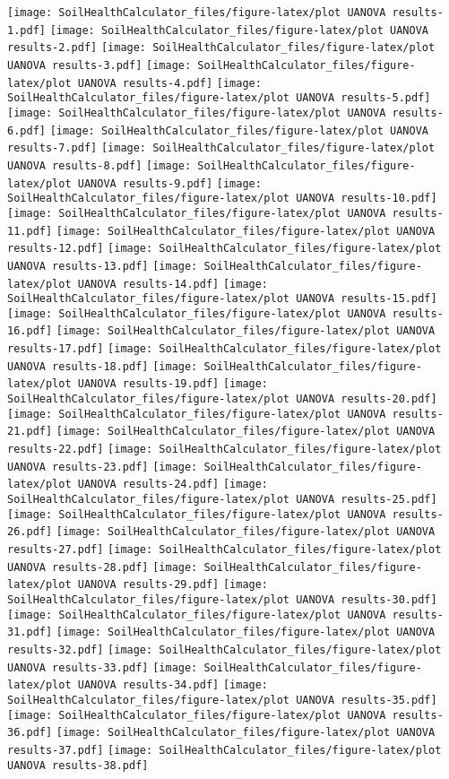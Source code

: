 \documentclass[]{article}
\begin{document}
\texttt{[image: SoilHealthCalculator\_files/figure-latex/plot UANOVA results-1.pdf]}
\texttt{[image: SoilHealthCalculator\_files/figure-latex/plot UANOVA results-2.pdf]}
\texttt{[image: SoilHealthCalculator\_files/figure-latex/plot UANOVA results-3.pdf]}
\texttt{[image: SoilHealthCalculator\_files/figure-latex/plot UANOVA results-4.pdf]}
\texttt{[image: SoilHealthCalculator\_files/figure-latex/plot UANOVA results-5.pdf]}
\texttt{[image: SoilHealthCalculator\_files/figure-latex/plot UANOVA results-6.pdf]}
\texttt{[image: SoilHealthCalculator\_files/figure-latex/plot UANOVA results-7.pdf]}
\texttt{[image: SoilHealthCalculator\_files/figure-latex/plot UANOVA results-8.pdf]}
\texttt{[image: SoilHealthCalculator\_files/figure-latex/plot UANOVA results-9.pdf]}
\texttt{[image: SoilHealthCalculator\_files/figure-latex/plot UANOVA results-10.pdf]}
\texttt{[image: SoilHealthCalculator\_files/figure-latex/plot UANOVA results-11.pdf]}
\texttt{[image: SoilHealthCalculator\_files/figure-latex/plot UANOVA results-12.pdf]}
\texttt{[image: SoilHealthCalculator\_files/figure-latex/plot UANOVA results-13.pdf]}
\texttt{[image: SoilHealthCalculator\_files/figure-latex/plot UANOVA results-14.pdf]}
\texttt{[image: SoilHealthCalculator\_files/figure-latex/plot UANOVA results-15.pdf]}
\texttt{[image: SoilHealthCalculator\_files/figure-latex/plot UANOVA results-16.pdf]}
\texttt{[image: SoilHealthCalculator\_files/figure-latex/plot UANOVA results-17.pdf]}
\texttt{[image: SoilHealthCalculator\_files/figure-latex/plot UANOVA results-18.pdf]}
\texttt{[image: SoilHealthCalculator\_files/figure-latex/plot UANOVA results-19.pdf]}
\texttt{[image: SoilHealthCalculator\_files/figure-latex/plot UANOVA results-20.pdf]}
\texttt{[image: SoilHealthCalculator\_files/figure-latex/plot UANOVA results-21.pdf]}
\texttt{[image: SoilHealthCalculator\_files/figure-latex/plot UANOVA results-22.pdf]}
\texttt{[image: SoilHealthCalculator\_files/figure-latex/plot UANOVA results-23.pdf]}
\texttt{[image: SoilHealthCalculator\_files/figure-latex/plot UANOVA results-24.pdf]}
\texttt{[image: SoilHealthCalculator\_files/figure-latex/plot UANOVA results-25.pdf]}
\texttt{[image: SoilHealthCalculator\_files/figure-latex/plot UANOVA results-26.pdf]}
\texttt{[image: SoilHealthCalculator\_files/figure-latex/plot UANOVA results-27.pdf]}
\texttt{[image: SoilHealthCalculator\_files/figure-latex/plot UANOVA results-28.pdf]}
\texttt{[image: SoilHealthCalculator\_files/figure-latex/plot UANOVA results-29.pdf]}
\texttt{[image: SoilHealthCalculator\_files/figure-latex/plot UANOVA results-30.pdf]}
\texttt{[image: SoilHealthCalculator\_files/figure-latex/plot UANOVA results-31.pdf]}
\texttt{[image: SoilHealthCalculator\_files/figure-latex/plot UANOVA results-32.pdf]}
\texttt{[image: SoilHealthCalculator\_files/figure-latex/plot UANOVA results-33.pdf]}
\texttt{[image: SoilHealthCalculator\_files/figure-latex/plot UANOVA results-34.pdf]}
\texttt{[image: SoilHealthCalculator\_files/figure-latex/plot UANOVA results-35.pdf]}
\texttt{[image: SoilHealthCalculator\_files/figure-latex/plot UANOVA results-36.pdf]}
\texttt{[image: SoilHealthCalculator\_files/figure-latex/plot UANOVA results-37.pdf]}
\texttt{[image: SoilHealthCalculator\_files/figure-latex/plot UANOVA results-38.pdf]}
\end{document}
